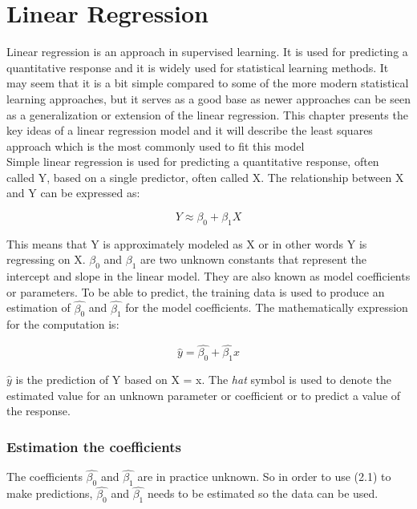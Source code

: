 \chapter{Linear Regression}
\label{chp:linreg}

Linear regression is an approach in supervised learning. It is used for predicting a quantitative response and it is widely used for statistical learning methods. It may seem that it is a bit simple compared to some of the more modern statistical learning approaches, but it serves as a good base as newer approaches can be seen as a generalization or extension of the linear regression. 
This chapter presents the key ideas of a linear regression model and it will describe the least squares approach
which is the most commonly used to fit this model\\

Simple linear regression is used for predicting a quantitative response, often called Y, based on a single predictor, often called X.
The relationship between X and Y can be expressed as:

\begin{equation}
Y \approx \beta_0 + \beta_1X
\end{equation}

This means that Y is approximately modeled as X or in other words Y is regressing on X. 
$\beta_0$ and $\beta_1$ are two unknown constants that represent the intercept and slope in the linear model. They are also known as model coefficients or parameters. 
To be able to predict, the training data is used to produce
an estimation of $\hat{\beta_0}$ and $\hat{\beta_1}$ for the model coefficients. 
The mathematically expression for the computation is:

\begin{equation}
\hat{y} = \hat{\beta_0} + \hat{\beta_1}x
\end{equation}

$\hat{y}$ is the prediction of Y based on X = x. The \textit{hat} symbol is used to denote the estimated value for an unknown parameter or coefficient or to predict a value of the response.

\subsection{Estimation the coefficients}

The coefficients 
$\hat{\beta_0}$ and  $\hat{\beta_1}$ are in practice unknown. So in order to use (2.1) to make predictions, $\hat{\beta_0}$ and  $\hat{\beta_1}$ needs to be estimated so the data can be used. 

